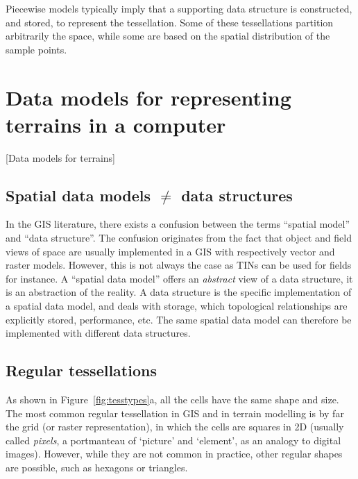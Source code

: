 %

Piecewise models typically imply that a supporting data structure is constructed, and stored, to represent the tessellation.
Some of these tessellations partition arbitrarily the space, while some are based on the spatial distribution of the sample points.


%
\section[Data models for terrains]{Data models for representing terrains in a computer}[Data models for terrains]

\subsection{Spatial data models $\neq$ data structures}

In the GIS literature, there exists a confusion between the terms ``spatial model'' and ``data structure''. 
The confusion originates from the fact that object and field views of space are usually implemented in a GIS with respectively vector and raster models. 
However, this is not always the case as TINs can be used for fields for instance.
A ``spatial data model'' offers an \emph{abstract} view of a data structure, it is an abstraction of the reality.
A data structure is the specific implementation of a spatial data model, and deals with storage, which topological relationships are explicitly stored, performance, etc.
The same spatial data model can therefore be implemented with different data structures.



\subsection{Regular tessellations} 

As shown in Figure~\ref{fig:tesstypes}a, all the cells have the same shape and size.
The most common regular tessellation in GIS and in terrain modelling is by far the grid (or raster representation), in which the cells are squares in 2D (usually called \emph{pixels}, a portmanteau of `picture' and `element', as an analogy to digital images).
However, while they are not common in practice, other regular shapes are possible, such as hexagons or triangles.

